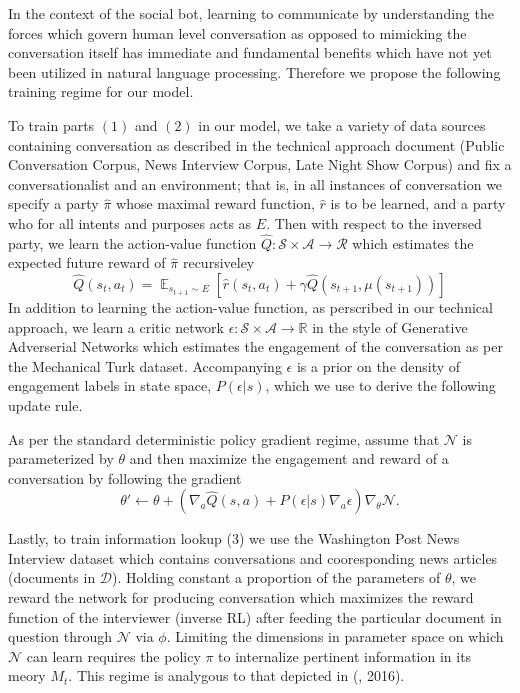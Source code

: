 \documentclass{article} %
\def\expect{\mathop{{\mathbb{E}}}}
\theoremstyle{named}
\def\scripta{{\mathcal A}}
\def\scriptr{{\mathcal R}}
\def\scriptd{{\mathcal D}}
\def\scriptn{{\mathcal N}}
\def\scripts{{\mathcal S}}
\begin{document}
In the context of the social bot, learning to communicate by understanding the forces which govern human level conversation as opposed to mimicking the conversation itself has immediate and fundamental benefits which have not yet been utilized in natural language processing. Therefore we propose the following training regime for our model.

To train parts $(1)$ and $(2)$ in our model, we take a variety of data sources containing conversation as described in the technical approach document (Public Conversation Corpus, News Interview Corpus, Late Night Show Corpus) and fix a conversationalist and an environment; that is, in all instances of conversation we specify a party $\hat{\pi}$ whose maximal reward function, $\hat{r}$ is to be learned, and a party who for all intents and purposes acts as $E$. Then with respect to the inversed party, we learn the action-value function $\hat{Q}: \scripts \times \scripta \to \scriptr$ which estimates the expected future reward of $\hat{\pi}$ recursiveley
\begin{equation*}
    \hat{Q}(s_t, a_t) = \expect_{s_{t+1} \sim E}\left[\hat{r}(s_{t}, a_t) + \gamma \hat{Q}(s_{t+1}, \mu(s_{t+1}))\right]
\end{equation*}
In addition to learning the action-value function, as perscribed in our technical approach, we learn a critic network $\epsilon: \scripts \times \scripta \to \mathbb{R}$ in the style of Generative Adverserial Networks \cite{NIPS2014_5423} which estimates the engagement of the conversation as per the Mechanical Turk dataset. Accompanying $\epsilon$ is a prior on the density of engagement labels in state space, $P(\epsilon | s)$, which we use to derive the following update rule.

As per the standard deterministic policy gradient \cite{icml2014c1_silver14} regime, assume that $\scriptn$ is parameterized by $\theta$ and then maximize the engagement and reward of a conversation by following the gradient
\begin{equation*}
	\theta' \leftarrow \theta + \left( \nabla_a \hat{Q}(s, a)  + P(\epsilon | s)\nabla_a \epsilon \right)\nabla_\theta  \scriptn.
\end{equation*}

Lastly, to train information lookup (3) we use the Washington Post News Interview dataset which contains conversations and cooresponding news articles (documents in $\scriptd$). Holding constant a proportion of the parameters of $\theta$, we reward the network for producing conversation which maximizes the reward function of the interviewer (inverse RL) after feeding the particular document in question through $\scriptn$ via $\phi.$ Limiting the dimensions in parameter space on which $\scriptn$ can learn requires the policy $\pi$ to internalize pertinent information in its meory $M_t.$ This regime is analygous to that depicted in (\citeauthor{DBLP:journals/corr/SantoroBBWL16}, 2016).



\printbibliography
\end{document}
